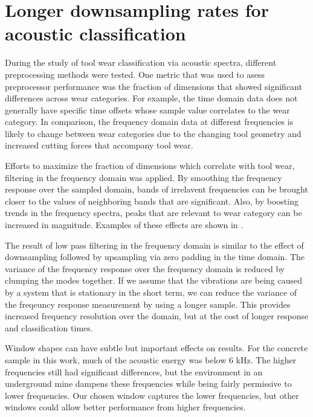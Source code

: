 \chapter{Longer downsampling rates for acoustic classification
\label{chap:9}}

During the study of tool wear classification via acoustic spectra, 
different preprocessing methods were tested. 
One metric that was used to asess preprocessor performance was
the fraction of dimensions that showed significant differences 
across wear categories.
For example, the time domain data does not generally have specific 
time offsets whose sample value correlates to the wear category.
In comparison, the frequency domain data at different frequencies
is likely to change between wear categories due to the changing tool geometry
and increased cutting forces that accompany tool wear.

Efforts to maximize the fraction of dimensions which correlate with tool wear,
filtering in the frequency domain was applied.
By smoothing the frequency response over the sampled domain,
bands of irrelavent frequencies can be brought closer to the
values of neighboring bands that are significant. 
Also, by boosting trends in the frequency spectra, peaks that are
relevant to wear category can be increased in magnitude.
Examples of these effects are shown in .

The result of low pass filtering in the frequency domain is similar
to the effect of downsampling followed by upsampling 
via zero padding in the time domain. 
The variance of the 
frequency response over the frequency domain is reduced by clumping
the modes together.
If we assume that the vibrations are being caused by a system that is 
stationary in the short term, we can reduce the variance of the freqeuncy 
response measurement by using a longer sample.
This provides increased frequency resolution over the domain,
but at the cost of longer response and classification times.

Window shapes can have subtle but important effects on results.
For the concrete sample in this work, much of the acoustic energy was
below 6 kHz. The higher frequencies still had significant differences,
but the environment in an underground mine dampens these frequencies while
being fairly permissive to lower frequencies. 
Our chosen window captures the lower frequencies, but other windows
could allow better performance from higher frequencies.

